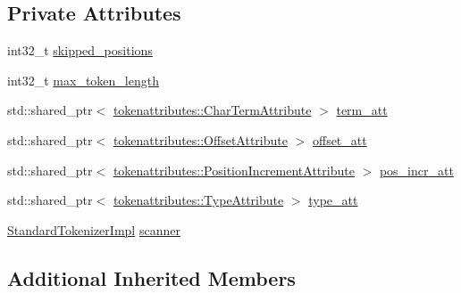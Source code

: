\subsection*{Private Attributes}
\begin{DoxyCompactItemize}
\item 
int32\+\_\+t \mbox{\hyperlink{classlucene_1_1core_1_1analysis_1_1standard_1_1StandardTokenizer_a822d3e10bec987a36a17344f56e043e3}{skipped\+\_\+positions}}
\item 
int32\+\_\+t \mbox{\hyperlink{classlucene_1_1core_1_1analysis_1_1standard_1_1StandardTokenizer_a94d9646f952d3b00e2329adb31dd8ff2}{max\+\_\+token\+\_\+length}}
\item 
std\+::shared\+\_\+ptr$<$ \mbox{\hyperlink{classlucene_1_1core_1_1analysis_1_1tokenattributes_1_1CharTermAttribute}{tokenattributes\+::\+Char\+Term\+Attribute}} $>$ \mbox{\hyperlink{classlucene_1_1core_1_1analysis_1_1standard_1_1StandardTokenizer_a92fedf9b1a1985ff3f1215004684bf4d}{term\+\_\+att}}
\item 
std\+::shared\+\_\+ptr$<$ \mbox{\hyperlink{classlucene_1_1core_1_1analysis_1_1tokenattributes_1_1OffsetAttribute}{tokenattributes\+::\+Offset\+Attribute}} $>$ \mbox{\hyperlink{classlucene_1_1core_1_1analysis_1_1standard_1_1StandardTokenizer_a80ec2aca819b34dc48ad99408a39fc2d}{offset\+\_\+att}}
\item 
std\+::shared\+\_\+ptr$<$ \mbox{\hyperlink{classlucene_1_1core_1_1analysis_1_1tokenattributes_1_1PositionIncrementAttribute}{tokenattributes\+::\+Position\+Increment\+Attribute}} $>$ \mbox{\hyperlink{classlucene_1_1core_1_1analysis_1_1standard_1_1StandardTokenizer_a7fda0cbb61043d793db131ccc70eaaec}{pos\+\_\+incr\+\_\+att}}
\item 
std\+::shared\+\_\+ptr$<$ \mbox{\hyperlink{classlucene_1_1core_1_1analysis_1_1tokenattributes_1_1TypeAttribute}{tokenattributes\+::\+Type\+Attribute}} $>$ \mbox{\hyperlink{classlucene_1_1core_1_1analysis_1_1standard_1_1StandardTokenizer_ab3d625b382877b9e75fd3f05bd834e50}{type\+\_\+att}}
\item 
\mbox{\hyperlink{classlucene_1_1core_1_1analysis_1_1standard_1_1StandardTokenizerImpl}{Standard\+Tokenizer\+Impl}} \mbox{\hyperlink{classlucene_1_1core_1_1analysis_1_1standard_1_1StandardTokenizer_adb4702e24ca7dc4a5ff3e92e5249acbe}{scanner}}
\end{DoxyCompactItemize}
\subsection*{Additional Inherited Members}


